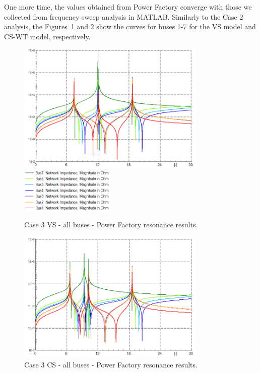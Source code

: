 \documentclass[12pt]{report} %
\begin{document}
One more time, the values obtained from Power Factory converge with those we collected from frequency sweep analysis in MATLAB. Similarly to the Case 2 analysis, the Figures~\ref{fig:c3pfvs2} and \ref{fig:c3pfcs2} show the curves for buses 1-7 for the VS model and CS-WT model, respectively.

\begin{figure}[htb]
	\centering
	\includegraphics[width=0.8\textwidth]{img/Case3/PF_impAll_VS.PNG}
	\includegraphics[width=0.4\textwidth]{img/Case3/PF_impAllLegend.PNG}
	\caption{Case 3 VS - all buses - Power Factory resonance results.}
  	\label{fig:c3pfvs2}
\end{figure}
\FloatBarrier

\begin{figure}[htb]
	\centering
	\includegraphics[width=0.8\textwidth]{img/Case3/PF_impAll_CS.PNG}
	\caption{Case 3 CS - all buses - Power Factory resonance results.}
  	\label{fig:c3pfcs2}
\end{figure}
\FloatBarrier
\end{document}
